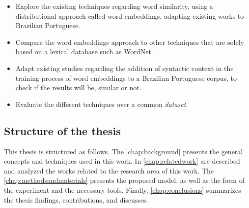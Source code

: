 \begin{itemize}
    \item Explore the existing techniques regarding word similarity, using a distributional approach called word embeddings, adapting existing works to Brazilian Portuguese.
    \item Compare the word embeddings approach to other techniques that are solely based on a lexical database such as WordNet.
    \item Adapt existing studies regarding the addition of syntactic context in the training process of word embeddings to a Brazilian Portuguese corpus, to check if the results will be, similar or not. 
    \item Evaluate the different techniques over a common \textit{dataset}.
\end{itemize}

\subsection{Structure of the thesis}

This thesis is structured as follows. The \autoref{chap:background} presents the general concepts and techniques used in this work. In \autoref{chap:relatedwork} are described and analyzed the works related to the research area of this work. The \autoref{chap:methodsandmaterials} presents the proposed model, as well as the form of the experiment and the necessary tools. 
Finally, \autoref{chap:conclusions} summarizes the thesis findings, contributions, and discusses.


